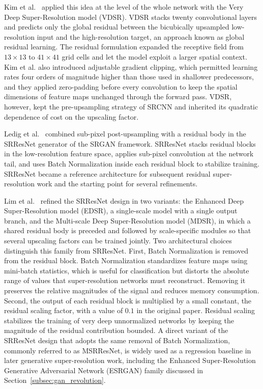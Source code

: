 Kim et al.~\cite{kim2016accurate} applied this idea at the level of the whole network with the Very Deep Super-Resolution model (VDSR). VDSR stacks twenty convolutional layers and predicts only the global residual between the bicubically upsampled low-resolution input and the high-resolution target, an approach known as global residual learning. The residual formulation expanded the receptive field from $13 \times 13$ to $41 \times 41$ grid cells and let the model exploit a larger spatial context. Kim et al. also introduced adjustable gradient clipping, which permitted learning rates four orders of magnitude higher than those used in shallower predecessors, and they applied zero-padding before every convolution to keep the spatial dimensions of feature maps unchanged through the forward pass. VDSR, however, kept the pre-upsampling strategy of SRCNN and inherited its quadratic dependence of cost on the upscaling factor.

Ledig et al.~\cite{cvf_srgan} combined sub-pixel post-upsampling with a residual body in the SRResNet generator of the SRGAN framework. SRResNet stacks residual blocks in the low-resolution feature space, applies sub-pixel convolution at the network tail, and uses Batch Normalization inside each residual block to stabilize training. SRResNet became a reference architecture for subsequent residual super-resolution work and the starting point for several refinements.

Lim et al.~\cite{lim2017enhanced} refined the SRResNet design in two variants: the Enhanced Deep Super-Resolution model (EDSR), a single-scale model with a single output branch, and the Multi-scale Deep Super-Resolution model (MDSR), in which a shared residual body is preceded and followed by scale-specific modules so that several upscaling factors can be trained jointly. Two architectural choices distinguish this family from SRResNet. First, Batch Normalization is removed from the residual block. Batch Normalization standardizes feature maps using mini-batch statistics, which is useful for classification but distorts the absolute range of values that super-resolution networks must reconstruct. Removing it preserves the relative magnitudes of the signal and reduces memory consumption. Second, the output of each residual block is multiplied by a small constant, the residual scaling factor, with a value of $0.1$ in the original paper. Residual scaling stabilizes the training of very deep unnormalized networks by keeping the magnitude of the residual contribution bounded. A direct variant of the SRResNet design that adopts the same removal of Batch Normalization, commonly referred to as MSRResNet, is widely used as a regression baseline in later generative super-resolution work, including the Enhanced Super-Resolution Generative Adversarial Network (ESRGAN) family discussed in Section~\ref{subsec:gan_revolution}.

